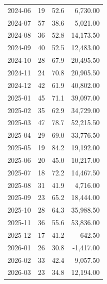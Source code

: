 \documentclass[11pt,a4paper,twoside]{article}
\begin{document}
\begin{center}
\begin{tabular}{>{\color{txtmain}}l rrr}
2024-06 & 19 & 52.6 & \textcolor{wingreen}{6,730.00} \\
2024-07 & 57 & 38.6 & \textcolor{wingreen}{5,021.00} \\
2024-08 & 36 & 52.8 & \textcolor{wingreen}{14,173.50} \\
2024-09 & 40 & 52.5 & \textcolor{wingreen}{12,483.00} \\
2024-10 & 28 & 67.9 & \textcolor{wingreen}{20,495.50} \\
2024-11 & 24 & 70.8 & \textcolor{wingreen}{20,905.50} \\
2024-12 & 42 & 61.9 & \textcolor{wingreen}{40,802.00} \\
2025-01 & 45 & 71.1 & \textcolor{wingreen}{39,097.00} \\
2025-02 & 35 & 62.9 & \textcolor{wingreen}{34,729.00} \\
2025-03 & 47 & 78.7 & \textcolor{wingreen}{52,215.50} \\
2025-04 & 29 & 69.0 & \textcolor{wingreen}{33,776.50} \\
2025-05 & 19 & 84.2 & \textcolor{wingreen}{19,192.00} \\
2025-06 & 20 & 45.0 & \textcolor{wingreen}{10,217.00} \\
2025-07 & 18 & 72.2 & \textcolor{wingreen}{14,467.50} \\
2025-08 & 31 & 41.9 & \textcolor{wingreen}{4,716.00} \\
2025-09 & 23 & 65.2 & \textcolor{wingreen}{18,444.00} \\
2025-10 & 28 & 64.3 & \textcolor{wingreen}{35,988.50} \\
2025-11 & 36 & 55.6 & \textcolor{wingreen}{53,836.00} \\
2025-12 & 17 & 41.2 & \textcolor{wingreen}{642.50} \\
2026-01 & 26 & 30.8 & \textcolor{lossred}{-1,417.00} \\
2026-02 & 33 & 42.4 & \textcolor{wingreen}{9,057.50} \\
2026-03 & 23 & 34.8 & \textcolor{wingreen}{12,194.00} \\
\bottomrule
\end{tabular}
\end{center}
\end{document}
